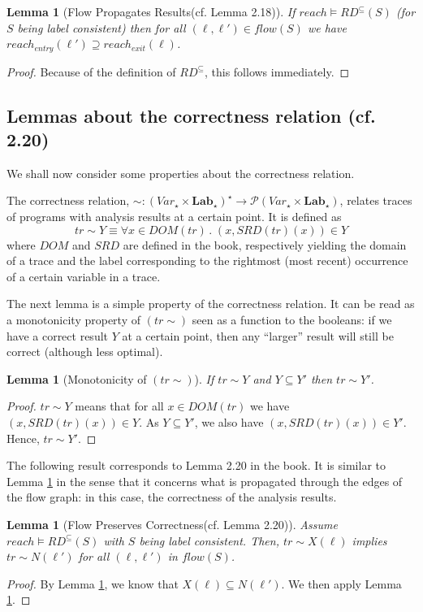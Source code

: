 \documentclass[a4wide,12pt]{article}
\theoremstyle{definition}
\theoremstyle{plain}
\newtheorem{lemma}[theo]{Lemma}
\theoremstyle{remark}
\def\pset#1{\mathcal{P}(#1)}
\def\Lab {\mathbf{Lab}}
\begin{document}
\begin{lemma}[Flow Propagates Results(cf. Lemma 2.18)]
\label{lem218}
If $reach \models RD^\subseteq(S)$ (for $S$ being label consistent) then for all
$(\ell, \ell') \in flow(S)$ we have $reach_{entry}(\ell') \supseteq reach_{exit}(\ell)$.
\end{lemma}
\begin{proof}
Because of the definition of $RD^\subseteq$, this follows
immediately.
\end{proof}

\subsection*{Lemmas about the correctness relation (cf. 2.20) }

We shall now consider some properties about the correctness relation.


The correctness relation, $\sim: (Var_\star \times \Lab_\star)^\star \to \pset{Var_\star \times \Lab_\star}$,
relates traces of programs with analysis results at a certain point. It is defined as
\[tr \sim Y \equiv \forall x \in DOM(tr) \,.\; (x,SRD(tr)(x)) \in Y\]
where $DOM$ and $SRD$ are defined in the book, respectively yielding
the domain of a trace and the label corresponding to the rightmost (most recent) 
occurrence of a certain variable in a trace.

The next lemma is a simple property of the correctness relation. It can be read as a monotonicity property
of $(tr \sim)$ seen as a function to the booleans: if we have a
correct result $Y$ at a certain point, then any ``larger'' result
will still be correct (although less optimal). 

\begin{lemma}[Monotonicity of $(tr \sim)$]
\label{lemmasq}
If $tr \sim Y$ and $Y \subseteq Y'$ then $tr \sim Y'$.
\end{lemma}
\begin{proof}
$tr \sim Y$ means that for all $x \in DOM (tr)$ we have $(x,SRD(tr)(x)) \in Y$. 
As $Y \subseteq Y'$, we also have $(x,SRD(tr)(x)) \in Y'$. Hence, $tr \sim Y'$.
\end{proof}

The following result corresponds to Lemma 2.20 in the book. 
It is similar to Lemma \ref{lem218} in the sense that it concerns what is propagated
through the edges of the flow graph: in this case, the correctness of the analysis results.

\begin{lemma}[Flow Preserves Correctness(cf. Lemma 2.20)]\label{lemmaflow}
Assume $reach \models RD^\subseteq(S)$ with $S$ being label consistent. Then,
$tr \sim X(\ell)$ implies $tr \sim N(\ell')$ for all $(\ell, \ell')$ in $flow(S)$.
\end{lemma}
\begin{proof}
By Lemma \ref{lem218}, we know that $X(\ell) \subseteq N(\ell')$. We then apply Lemma \ref{lemmasq}.
\end{proof}
\end{document}
